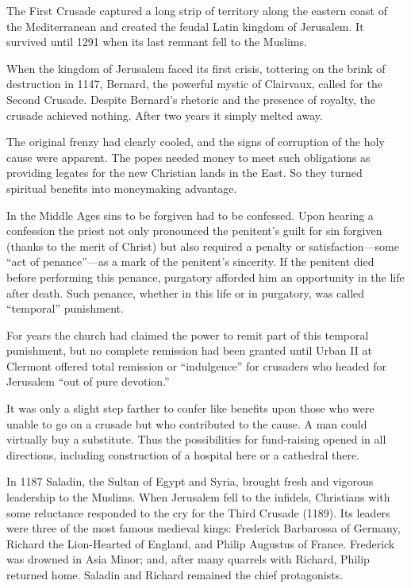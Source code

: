 The First Crusade captured a long strip of territory along the eastern coast of the Mediterranean
and created the feudal Latin kingdom of Jerusalem. It survived until 1291 when its last remnant fell
to the Muslims.

When the kingdom of Jerusalem faced its first crisis, tottering on the brink of destruction in 1147,
Bernard, the powerful mystic of Clairvaux, called for the Second Crusade. Despite Bernard’s rhetoric
and the presence of royalty, the crusade achieved nothing. After two years it simply melted away.

The original frenzy had clearly cooled, and the signs of corruption of the holy cause were apparent.
The popes needed money to meet such obligations as providing legates for the new Christian lands in
the East. So they turned spiritual benefits into moneymaking advantage.

In the Middle Ages sins to be forgiven had to be confessed. Upon hearing a confession the priest not
only pronounced the penitent’s guilt for sin forgiven (thanks to the merit of Christ) but also
required a penalty or satisfaction—some “act of penance”—as a mark of the penitent’s sincerity. If
the penitent died before performing this penance, purgatory afforded him an opportunity in the life
after death. Such penance, whether in this life or in purgatory, was called “temporal” punishment.

For years the church had claimed the power to remit part of this temporal punishment, but no
complete remission had been granted until Urban II at Clermont offered total remission or
“indulgence” for crusaders who headed for Jerusalem “out of pure devotion.”

It was only a slight step farther to confer like benefits upon those who were unable to go on a
crusade but who contributed to the cause. A man could virtually buy a substitute. Thus the
possibilities for fund-raising opened in all directions, including construction of a hospital here
or a cathedral there.

In 1187 Saladin, the Sultan of Egypt and Syria, brought fresh and vigorous leadership to the
Muslims. When Jerusalem fell to the infidels, Christians with some reluctance responded to the cry
for the Third Crusade (1189). Its leaders were three of the most famous medieval kings: Frederick
Barbarossa of Germany, Richard the Lion-Hearted of England, and Philip Augustus of France. Frederick
was drowned in Asia Minor; and, after many quarrels with Richard, Philip returned home. Saladin and
Richard remained the chief protagonists.


